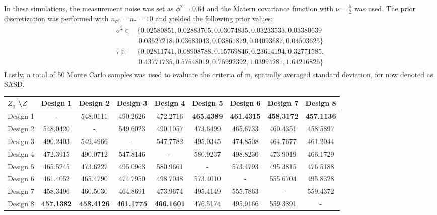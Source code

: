 In these simulations, the measurement noise was set as $\phi^2 = 0.64$ and the Matern covariance function with $\nu = \frac{5}{2}$ was used. The prior discretization was performed with $n_{\sigma^2} = n_{\tau} = 10$ and yielded the following prior values: 
\begin{align*}
\begin{split}
\sigma^2 \in &\{0.02580851, 0.02883705, 0.03074835, 0.03233533, 0.03380639 \\ & \ 0.03527218, 0.03683043, 0.03861879, 0.04093687, 0.04503625 \} \\
\tau \in &\{0.02811741, 0.08908788, 0.15769846, 0.23614194, 0.32771585, \\ & \ 0.43771735, 0.57548019, 0.75992392, 1.03994281, 1.64216826 \}
\end{split}
\end{align*} 
Lastly, a total of 50 Monte Carlo samples was used to evaluate the criteria of m, spatially averaged standard deviation, for now denoted as SASD.\\

\begin{minipage}{\linewidth}
 \label{tab:prior_parameters} 
\hspace{-35pt}
\begin{tabular}{ l || c | c | c | c | c | c | c | c } 
$Z_a$ \textbackslash  $Z$ & Design 1 & Design 2 & Design 3 & Design 4 & Design 5 & Design 6 & Design 7 & Design 8 \\
\hline \hline
Design 1 & - & 548.0111 & 490.2626 & 472.2716 & \textbf{465.4389} & \textbf{461.4315} & \textbf{458.3172} & \textbf{457.1136} \\
Design 2 & 548.0420 & - & 549.6023 & 490.1057 & 473.6499 & 465.6733 & 460.4351 & 458.5897 \\
Design 3 & 490.2403 & 549.4966 & - & 547.7782 & 495.0345 & 474.8508 & 464.7677 & 461.2044 \\
Design 4 & 472.3915 & 490.0712 & 547.8146 & - & 580.9237 & 498.8230 & 473.9019 & 466.1729 \\
Design 5 & 465.5245 & 473.6227 & 495.0963 & 580.9661 & - & 573.4793 & 495.3815 & 476.5188 \\
Design 6 & 461.4052 & 465.4790 & 474.7950 & 498.7048 & 573.4010 & - & 555.6704 & 495.8328 \\
Design 7 & 458.3496 & 460.5030 & 464.8691 & 473.9674 & 495.4149 & 555.7863 & - & 559.4372 \\
Design 8 & \textbf{457.1382} & \textbf{458.4126} & \textbf{461.1775} & \textbf{466.1601} & 476.5174 & 495.9166 & 559.3891 & -
\end{tabular}
\end{minipage}
\ \\

